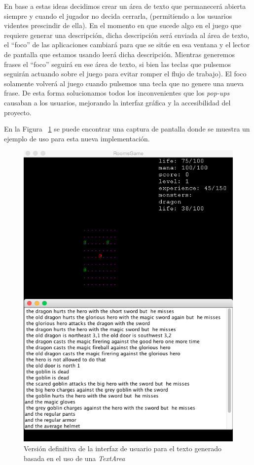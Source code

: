 En base a estas ideas decidimos crear un área de texto que permanecerá abierta siempre y cuando el jugador no decida cerrarla, (permitiendo a los usuarios videntes prescindir de ella). En el momento en que sucede algo en el juego que requiere generar una descripción, dicha descripción será enviada al área de texto, el ``foco'' de las aplicaciones cambiará para que se sitúe en esa ventana y el lector de pantalla que estamos usando leerá dicha descripción. Mientras generemos frases el ``foco'' seguirá en ese área de texto, si bien las teclas que pulsemos seguirán actuando sobre el juego para evitar romper el flujo de trabajo). El foco solamente volverá al juego cuando pulsemos una tecla que no genere una nueva frase.
De esta forma solucionamos todos los inconvenientes que los \textit{pop-ups} causaban a los usuarios, mejorando la interfaz gráfica y la accesibilidad del proyecto.

En la Figura ~\ref{fig:lastiterationui} se puede encontrar una captura de pantalla donde se muestra un ejemplo de uso para esta nueva implementación.

\begin{figure}
    \includegraphics[width=\textwidth,height=\textheight,keepaspectratio]{./img/lastiterationui.png}
  \caption{Versión definitiva de la interfaz de usuario para el texto generado basada en el uso de una \textit{TextArea}}
  \label{fig:lastiterationui}
\end{figure}


